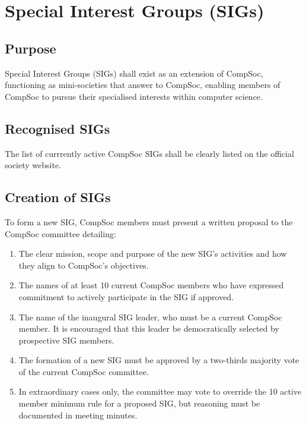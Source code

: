 \section{Special Interest Groups (SIGs)}

\subsection{Purpose}
Special Interest Groups (SIGs) shall exist as an extension of CompSoc, functioning as mini-societies that answer to CompSoc, enabling members of CompSoc to pursue their specialised interests within computer science.

\subsection{Recognised SIGs}
The list of currrently active CompSoc SIGs shall be clearly listed on the official society website.

\subsection{Creation of SIGs}
To form a new SIG, CompSoc members must present a written proposal to the CompSoc committee detailing:
\begin{enumerate}
    \item The clear mission, scope and purpose of the new SIG's activities and how they align to CompSoc's objectives.
    \item The names of at least 10 current CompSoc members who have expressed commitment to actively participate in the SIG if approved.
    \item The name of the inaugural SIG leader, who must be a current CompSoc member. It is  encouraged that this leader be democratically selected by prospective SIG members. 
    \item The formation of a new SIG must be approved by a two-thirds majority vote of the current CompSoc committee.  
    \item In extraordinary cases only, the committee may vote to override the 10 active member minimum rule for a proposed SIG, but reasoning must be documented in meeting minutes.
\end{enumerate}

